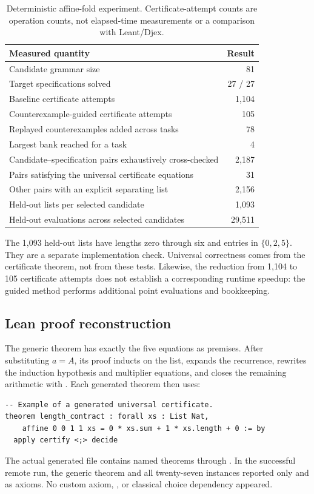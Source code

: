 \begin{table}[ht]
\centering\small
\begin{tabularx}{\textwidth}{@{}Y r@{}}
\toprule
Measured quantity & Result\\\midrule
Candidate grammar size & 81\\
Target specifications solved & 27 / 27\\
Baseline certificate attempts & 1,104\\
Counterexample-guided certificate attempts & 105\\
Replayed counterexamples added across tasks & 78\\
Largest bank reached for a task & 4\\
Candidate--specification pairs exhaustively cross-checked & 2,187\\
Pairs satisfying the universal certificate equations & 31\\
Other pairs with an explicit separating list & 2,156\\
Held-out lists per selected candidate & 1,093\\
Held-out evaluations across selected candidates & 29,511\\
\bottomrule
\end{tabularx}
\caption{Deterministic affine-fold experiment. Certificate-attempt counts are operation counts, not elapsed-time measurements or a comparison with Leant/Djex.}
\label{tab:affine}
\end{table}
The 1,093 held-out lists have lengths zero through six and entries in $\{0,2,5\}$. They are a separate implementation check. Universal correctness comes from the certificate theorem, not from these tests. Likewise, the reduction from 1,104 to 105 certificate attempts does not establish a corresponding runtime speedup: the guided method performs additional point evaluations and bookkeeping.

\subsection{Lean proof reconstruction}
The generic theorem has exactly the five equations as premises. After substituting $a=A$, its proof inducts on the list, expands the recurrence, rewrites the induction hypothesis and multiplier equations, and closes the remaining arithmetic with . Each generated theorem then uses:
\begin{lstlisting}
-- Example of a generated universal certificate.
theorem length_contract : forall xs : List Nat,
    affine 0 0 1 1 xs = 0 * xs.sum + 1 * xs.length + 0 := by
  apply certify <;> decide
\end{lstlisting}
The actual generated file contains named theorems  through . In the successful remote run, the generic theorem and all twenty-seven instances reported only  and  as axioms. No custom axiom, , or classical choice dependency appeared.

